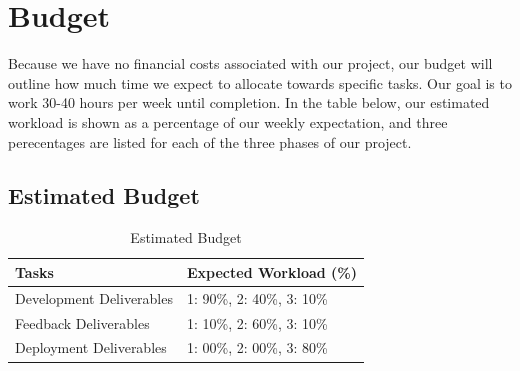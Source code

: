 \documentclass[12pt, letterpaper]{article}
\begin{document}
\pagebreak

\section*{Budget}
Because we have no financial costs associated with our project, our budget will outline how much time we expect to allocate towards specific tasks.  Our goal is to work 30-40 hours per week until completion.  In the table below, our estimated workload is shown as a percentage of our weekly expectation, and three perecentages are listed for each of the three phases of our project.  

\subsection*{Estimated Budget}
\begin{table}[h!]
\caption{Estimated Budget}
\centering
\begin{tabular}{|p{6cm}|p{6cm}|}
\hline
\textbf{Tasks} & \textbf{Expected Workload (\%)} \\
\hline
Development Deliverables & 1: 90\%, 2: 40\%, 3: 10\% \\
\hline
Feedback Deliverables & 1: 10\%, 2: 60\%, 3: 10\% \\
\hline
Deployment Deliverables & 1: 00\%, 2: 00\%, 3: 80\%\\
\hline
\end{tabular}
\end{table}
\end{document}
